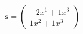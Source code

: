 \documentclass[preview]{standalone}
\begin{document}
\begin{align*}
\mathbf{s} = \begin{pmatrix}-2x^{1} + 1x^{3} \\ 1x^{2} + 1x^{3}\end{pmatrix}
\end{align*}
\end{document}
